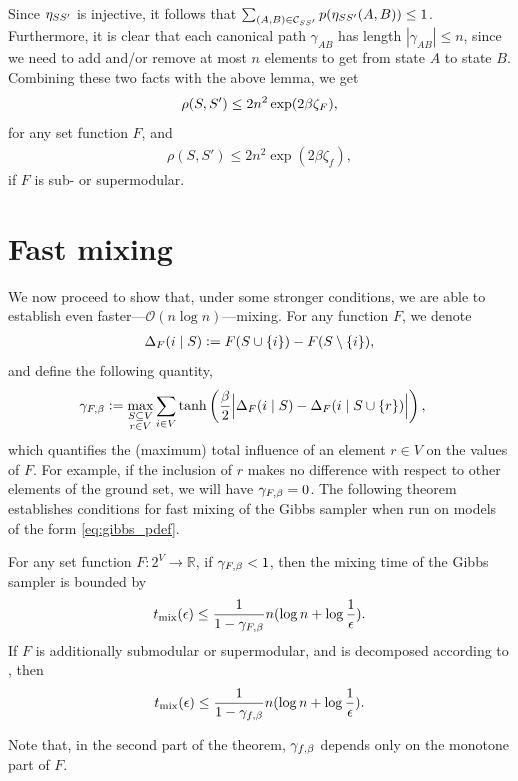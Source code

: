 Since $\eta_{SS'}$ is injective, it follows that $\sum_{(A, B) \in \mathcal{C}_{SS'}} p(\eta_{SS'}(A, B)) \leq 1$.
Furthermore, it is clear that each canonical path $\gamma_{AB}$ has length $|\gamma_{AB}| \leq n$, since we need to add and/or remove at most $n$ elements to get from state $A$ to state $B$.
Combining these two facts with the above lemma, we get
\begin{align*}
  \rho(S, S') \leq 2n^2 \exp(2 \beta \zeta_F),
\end{align*}
for any set function $F$, and
\begin{align*}
  \rho(S, S') \leq 2n^2 \exp(2 \beta \zeta_f),
\end{align*}
if $F$ is sub- or supermodular.


\section{Fast mixing}
We now proceed to show that, under some stronger conditions, we are able to establish even faster---$\mathcal{O}(n \log n)$---mixing.
For any function $F$, we denote
\begin{align*}
\Delta_F(i\mid S) \vcentcolon= F(S \cup \{i\}) - F(S \setminus \{i\}),
\end{align*}
and define the following quantity,
\begin{align*}
  \gamma_{F,\beta} &\vcentcolon= \max_{\substack{S \subseteq V\\r \in V}} \sum_{\substack{i \in V}} \tanh\left(\frac{\beta}{2} \Big|\Delta_F(i\mid S) - \Delta_F(i\mid S \cup \{r\})\Big| \right),
\end{align*}
which quantifies the (maximum) total influence of an element $r \in V$ on the values of $F$.
For example, if the inclusion of $r$ makes no difference with respect to other elements of the ground set, we will have $\gamma_{F,\beta} = 0$.
The following theorem establishes conditions for fast mixing of the Gibbs sampler when run on models of the form \eqref{eq:gibbs_pdef}.

\begin{theorem} \label{thm:fast}
  For any set function $F : 2^V \to \mathbb{R}$, if $\gamma_{F,\beta} < 1$, then the mixing time of the Gibbs sampler is bounded by
  \begin{align*}
  	t_{\mathrm{mix}}(\epsilon) \leq \frac{1}{1 - \gamma_{F,\beta}}n(\log n + \log \frac{1}{\epsilon}).
  \end{align*}
  If $F$ is additionally submodular or supermodular, and is decomposed according to , then
  \begin{align*}
  	t_{\mathrm{mix}}(\epsilon) \leq \frac{1}{1 - \gamma_{f,\beta}}n(\log n + \log \frac{1}{\epsilon}).
  \end{align*}
\end{theorem}
Note that, in the second part of the theorem, $\gamma_{f,\beta}$ depends only on the monotone part of $F$. 

